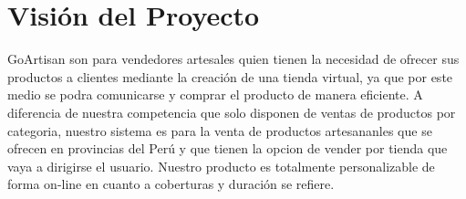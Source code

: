 \chapter{Visión del Proyecto}

GoArtisan son para vendedores artesales quien tienen la necesidad de ofrecer sus productos a clientes mediante la creación de una tienda virtual, ya que por este medio se podra comunicarse y comprar el producto de manera eficiente. A diferencia de nuestra competencia que solo disponen de ventas de productos por categoria, nuestro sistema es para la venta de productos artesananles que se ofrecen en provincias del Perú y que tienen la opcion de vender por tienda que vaya a dirigirse el usuario. Nuestro producto es totalmente personalizable de forma on-line en cuanto a coberturas y duración se refiere.